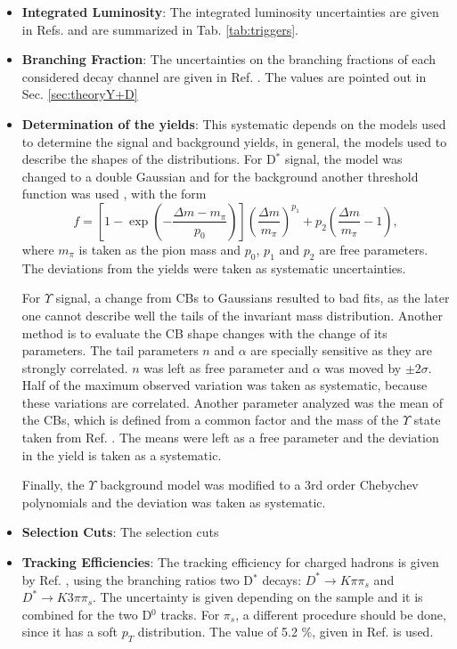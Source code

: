 \begin{itemize}
  \item \textbf{Integrated Luminosity}: The integrated luminosity uncertainties are given in Refs. \cite{CMS-PAS-LUM-17-001, CMS-PAS-LUM-17-004, CMS-PAS-LUM-18-002} and are summarized in Tab. \ref{tab:triggers}. 
  \item \textbf{Branching Fraction}: The uncertainties on the branching fractions of each considered decay channel are given in Ref. \cite{Workman:2022ynf}. The values are pointed out in Sec. \ref{sec:theoryY+D}
  \item \textbf{Determination of the yields}: This systematic depends on the models used to determine the signal and background yields, in general, the models used to describe the shapes of the distributions. For D$^*$ signal, the model was changed to a double Gaussian and for the background another threshold function was used \cite{CMS:2021lab}, with the form
  \begin{equation}
    f = \left[ 1- \exp{\left( -\frac{\Delta m - m_\pi}{p_0} \right)} \right]\left( \frac{\Delta m}{m_\pi} \right)^{p_1} +p_2 \left( \frac
    {\Delta m}{m_\pi} - 1 \right),
  \end{equation}
  where $m_\pi$ is taken as the pion mass and $p_0$, $p_1$ and $p_2$ are free parameters. The deviations from the yields were taken as systematic uncertainties.

  For $\Upsilon$ signal, a change from CBs to Gaussians resulted to bad fits, as the later one cannot describe well the tails of the invariant mass distribution. Another method is to evaluate the CB shape changes with the change of its parameters. The tail parameters $n$ and $\alpha$ are specially sensitive as they are strongly correlated. $n$ was left as free parameter and $\alpha$ was moved by $\pm 2\sigma$. Half of the maximum observed variation was taken as systematic, because these variations are correlated. Another parameter analyzed was the mean of the CBs, which is defined from a common factor and the mass of the $\Upsilon$ state taken from Ref. \cite{Workman:2022ynf}. The means were left as a free parameter and the deviation in the yield is taken as a systematic.

  Finally, the $\Upsilon$ background model was modified to a 3rd order Chebychev polynomials and the deviation was taken as systematic.
  \item \textbf{Selection Cuts}: The selection cuts 
  \item \textbf{Tracking Efficiencies}: The tracking efficiency for charged hadrons is given by Ref. \cite{CMS-DP-2022-012}, using the branching ratios two D$^*$ decays: $D^* \rightarrow K\pi\pi_s$ and $D^* \rightarrow K3\pi\pi_s$. The uncertainty is given depending on the sample and it is combined for the two D$^0$ tracks. For $\pi_s$, a different procedure should be done, since it has a soft $p_T$ distribution. The value of 5.2 \%, given in Ref. \cite{CMS:2021lab} is used.
\end{itemize}